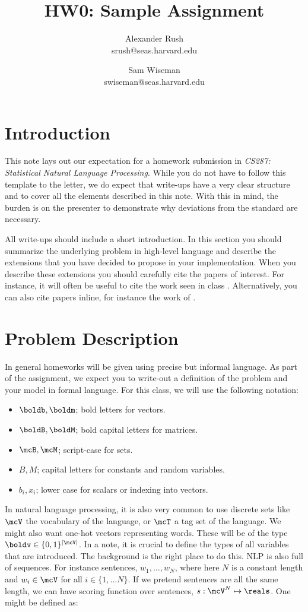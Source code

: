 \documentclass[11pt]{article}
\title{HW0: Sample Assignment}
\author{Alexander Rush \\ srush@seas.harvard.edu \and Sam Wiseman \\ swiseman@seas.harvard.edu }
\begin{document}
\maketitle{}
\section{Introduction}

This note lays out our expectation for a homework submission in
\textit{CS287: Statistical Natural Language Processing}. While you do
not have to follow this template to the letter, we do expect that
write-ups have a very clear structure and to cover all the elements
described in this note. With this in mind, the burden is on the
presenter to demonstrate why deviations from the standard are
necessary.

All write-ups should include a short introduction. In this section you
should summarize the underlying problem in high-level language and
describe the extensions that you have decided to propose in your
implementation. When you describe these extensions you should
carefully cite the papers of interest. For instance, it will often be
useful to cite the work seen in class \citep{murphy2012machine}. Alternatively, you can also cite papers inline, for instance the work of \citet{berger1996maximum}.


\section{Problem Description}

In general homeworks will be given using precise but informal
language. As part of the assignment, we expect you to write-out a
definition of the problem and your model in formal language. For this
class, we will use the following notation:

\begin{itemize}
\item $\boldb, \boldm$;  bold letters for vectors.
\item $\boldB, \boldM$;  bold capital letters for matrices.
\item $\mcB, \mcM$;  script-case for sets.
\item $B, M$; capital letters for constants and random variables.
\item $b_i, x_i$; lower case for scalars or indexing into vectors.
\end{itemize}


In natural language processing, it is also very common to use discrete
sets like $\mcV$ the vocabulary of the language, or $\mcT$ a tag set
of the language.  We might also want one-hot vectors representing
words. These will be of the type $\boldv \in \{0,1\}^{|\mcV|}$. In a
note, it is crucial to define the types of all variables that are
introduced. The background is the right place to do this. NLP is also
full of sequences. For instance sentences, $w_1, \ldots, w_N$, where
here $N$ is a constant length and $w_i \in \mcV$ for all
$i \in \{1, \ldots N\}$. If we pretend sentences are all the same
length, we can have scoring function over sentences,
$s : \mcV^N \mapsto \reals$.  One might be defined as:
\end{document}
